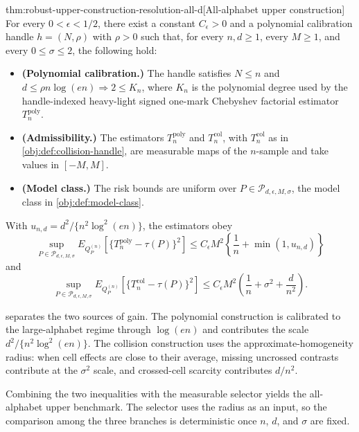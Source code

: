 \begin{theoremv}{thm:robust-upper-construction-resolution-all-d}[All-alphabet upper construction]
For every \(0<\epsilon<1/2\), there exist a constant \(C_\epsilon>0\) and a polynomial calibration handle \(h=(N,\rho)\) with \(\rho>0\) such that, for every \(n,d\ge 1\), every \(M\ge 1\), and every \(0\le \sigma\le 2\), the following hold:
\begin{itemize}
\item \textbf{(Polynomial calibration.)} The handle satisfies \(N\le n\) and \(d\le \rho n\log(en)\Rightarrow 2\le K_n\), where \(K_n\) is the polynomial degree used by the handle-indexed heavy-light signed one-mark Chebyshev factorial estimator \(T_n^{\mathrm{poly}}\).
\item \textbf{(Admissibility.)} The estimators \(T_n^{\mathrm{poly}}\) and \(T_n^{\mathrm{col}}\), with \(T_n^{\mathrm{col}}\) as in \cref{obj:def:collision-handle}, are measurable maps of the \(n\)-sample and take values in \([-M,M]\).
\item \textbf{(Model class.)} The risk bounds are uniform over \(P\in\mathcal P_{d,\epsilon,M,\sigma}\), the model class in \cref{obj:def:model-class}.
\end{itemize}
With \(u_{n,d}=d^2/\{n^2\log^2(en)\}\), the estimators obey
\[
\sup_{P\in\mathcal P_{d,\epsilon,M,\sigma}}
E_{Q_P^{(n)}}\!\left[\{T_n^{\mathrm{poly}}-\tau(P)\}^2\right]
\le
C_\epsilon M^2\left\{\frac1n+\min(1,u_{n,d})\right\}
\]
and
\[
\sup_{P\in\mathcal P_{d,\epsilon,M,\sigma}}
E_{Q_P^{(n)}}\!\left[\{T_n^{\mathrm{col}}-\tau(P)\}^2\right]
\le
C_\epsilon M^2\left(\frac1n+\sigma^2+\frac{d}{n^2}\right).
\]
\end{theoremv}

 separates the two sources of gain. The polynomial construction is calibrated to the large-alphabet regime through \(\log(en)\) and contributes the scale \(d^2/\{n^2\log^2(en)\}\). The collision construction uses the approximate-homogeneity radius: when cell effects are close to their average, missing uncrossed contrasts contribute at the \(\sigma^2\) scale, and crossed-cell scarcity contributes \(d/n^2\).

Combining the two inequalities with the measurable selector yields the all-alphabet upper benchmark. The selector uses the radius as an input, so the comparison among the three branches is deterministic once \(n\), \(d\), and \(\sigma\) are fixed.

